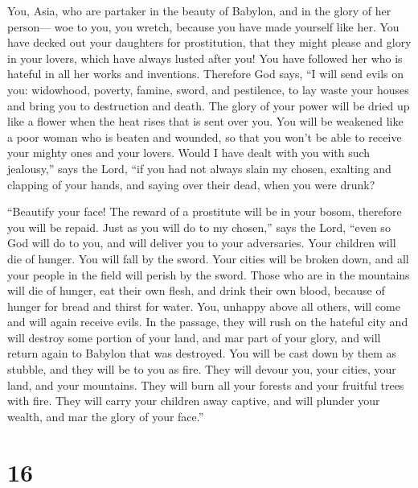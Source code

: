  You, Asia, who are partaker in the beauty of Babylon,
and in the glory of her person---  woe to you, you
wretch, because you have made yourself like her. You have decked out
your daughters for prostitution, that they might please and glory in
your lovers, which have always lusted after you!  You
have followed her who is hateful in all her works and inventions.
Therefore God says,  ``I will send evils on you:
widowhood, poverty, famine, sword, and pestilence, to lay waste your
houses and bring you to destruction and death.  The glory
of your power will be dried up like a flower when the heat rises that is
sent over you.  You will be weakened like a poor woman
who is beaten and wounded, so that you won't be able to receive your
mighty ones and your lovers.  Would I have dealt with you
with such jealousy,'' says the Lord,  ``if you had not
always slain my chosen, exalting and clapping of your hands, and saying
over their dead, when you were drunk?

 ``Beautify your face!  The reward of a
prostitute will be in your bosom, therefore you will be repaid.
 Just as you will do to my chosen,'' says the Lord,
``even so God will do to you, and will deliver you to your adversaries.
 Your children will die of hunger. You will fall by the
sword. Your cities will be broken down, and all your people in the field
will perish by the sword.  Those who are in the mountains
will die of hunger, eat their own flesh, and drink their own blood,
because of hunger for bread and thirst for water.  You,
unhappy above all others, will come and will again receive evils.
 In the passage, they will rush on the hateful city and
will destroy some portion of your land, and mar part of your glory, and
will return again to Babylon that was destroyed.  You
will be cast down by them as stubble, and they will be to you as fire.
 They will devour you, your cities, your land, and your
mountains. They will burn all your forests and your fruitful trees with
fire.  They will carry your children away captive, and
will plunder your wealth, and mar the glory of your face.''

\hypertarget{section-15}{%
\section{16}\label{section-15}}

